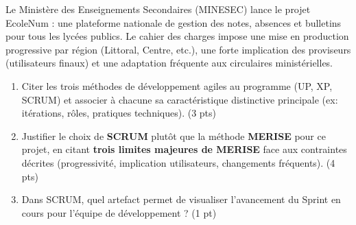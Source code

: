 \documentclass[11pt]{article}
\begin{document}
\begin{exercice}
Le Ministère des Enseignements Secondaires (MINESEC) lance le projet \og EcoleNum \fg{} : une plateforme nationale de gestion des notes, absences et bulletins pour tous les lycées publics. Le cahier des charges impose une mise en production progressive par région (Littoral, Centre, etc.), une forte implication des proviseurs (utilisateurs finaux) et une adaptation fréquente aux circulaires ministérielles.

\begin{enumerate}
    \item Citer les trois méthodes de développement agiles au programme (UP, XP, SCRUM) et associer à chacune sa caractéristique distinctive principale (ex: itérations, rôles, pratiques techniques). \hfill (3 pts)
    \item Justifier le choix de \textbf{SCRUM} plutôt que la méthode \textbf{MERISE} pour ce projet, en citant \textbf{trois limites majeures de MERISE} face aux contraintes décrites (progressivité, implication utilisateurs, changements fréquents). \hfill (4 pts)
    \item Dans SCRUM, quel artefact permet de visualiser l'avancement du Sprint en cours pour l'équipe de développement ? \hfill (1 pt)
\end{enumerate}
\end{exercice}
\end{document}
